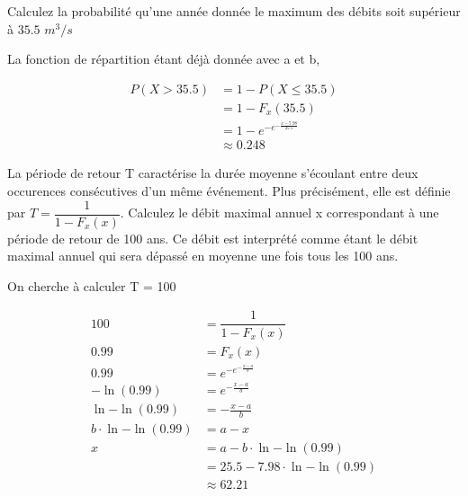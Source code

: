 \begin{exo}
	\begin{subexo}{Calculez la probabilité qu'une année donnée le maximum des débits soit supérieur à $35.5$  $m^3/s$}
  		\begin{center}
  			La fonction de répartition étant déjà donnée avec a et b,
  		\end{center}
		\begin{align*}
			P(X > 35.5) &= 1 - P(X \leq 35.5) \\
			&= 1 - F_x(35.5) \\
	  		&= 1 - e^{-e^{-\frac{x-7.98}{25.5}}}\\
	  		&\approx 0.248
	 	\end{align*}
  	\end{subexo}
  	\begin{subexo}{La période de retour T caractérise la durée moyenne s'écoulant entre deux occurences consécutives d'un même événement. Plus précisément, elle est définie par $ T = \dfrac{1}{1- F_x(x)}$. Calculez le débit maximal annuel x correspondant à une période de retour de 100 ans. Ce débit est interprété comme étant le débit maximal annuel qui sera dépassé en moyenne une fois tous les 100 ans.}
	\begin{center}
		On cherche à calculer T = 100
	\end{center}
	\begin{align*}
		100 &=  \dfrac{1}{1- F_x(x)}\\
		0.99 &= F_x(x) \\
		0.99 &= e^{-e^{-\frac{x-a}{b}}} \\
		-\ln(0.99) &= e^{-\frac{x-a}{b}} \\ 
		\ln{-\ln(0.99)} &= -\frac{x-a}{b} \\ 
		b\cdot \ln{-\ln(0.99)} &= a-x \\ 
		x &= a-b\cdot \ln{-\ln(0.99)} \\ 
		&= 25.5 -7.98\cdot \ln{-\ln(0.99)} \\
		&\approx 62.21
	\end{align*}
	\end{subexo}
\end{exo}
